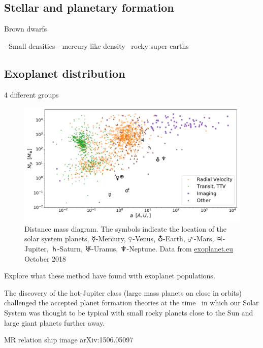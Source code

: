 


\subsection{Stellar and planetary formation}

Brown dwarfs


- Small densities - mercury like  density~\citet{dittmann_temperate_2017, santerne_earthsized_2018, ment_second_2018} rocky super-earths\\


\subsection{Exoplanet distribution} 4 different groups

\fref{}


\begin{figure}
    \centering
    \includegraphics[width=0.7\linewidth]{./figures/introduction/exoplanetEU_a_mass.pdf}
    \caption{Distance mass diagram.
        The symbols indicate the location of the solar system planets, $\mercury$-Mercury, $\venus$-Venus, $\earth$-Earth, $\mars$-Mars, $\jupiter$-Jupiter, $\saturn$-Saturn, $\uranus$-Uranus, $\neptune$-Neptune. Data from \href{http://ww.exoplanet.eu}{exoplanet.eu} October 2018}
    \label{fig:pltoverlayadd}
\end{figure}


Explore what these method have found with exoplanet populations.

The discovery of the hot-Jupiter class (large mass planets on close in orbits) challenged the accepted planet formation theories at the time~\citep[.e.g][]{pollack_formation_1996} in which our Solar System was thought to be typical with small rocky planets close to the Sun and large giant planets further away.



MR relation ship image arXiv:1506.05097~\citet{chen_probabilistic_2016}

